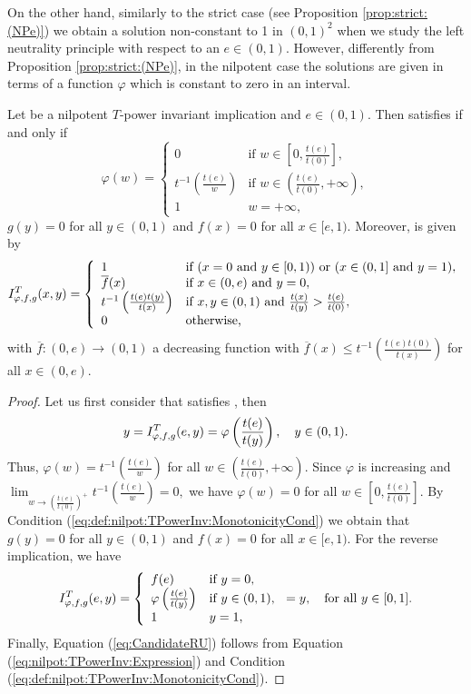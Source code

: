 On the other hand, similarly to the strict case (see Proposition \ref{prop:strict:(NPe)}) we obtain a solution non-constant to 1 in $(0,1)^2$ when we study the left neutrality principle with respect to an $e \in (0,1)$. However, differently from Proposition \ref{prop:strict:(NPe)}, in the nilpotent case the solutions are given in terms of a function $\varphi$ which is constant to zero in an interval.
\begin{proposition}\label{prop:nilpotent:(NPe)}
	Let \IT be a nilpotent $T$-power invariant implication and $e \in (0,1)$. Then \IT satisfies \NPe if and only if 
	$$\varphi(w)
	=
	\left\{ \begin{array}{ll}
		0 &   \text{if }   w \in \left[0,\frac{t(e)}{t(0)}\right], \\
		t^{-1} \left(\frac{t(e)}{w}\right) &  \text{if }  w \in \left(\frac{t(e)}{t(0)},+\infty\right), \\
		1 & w=+ \infty,
	\end{array}
	\right.
	$$
	$g(y)=0$ for all $y \in (0,1)$ and $f(x)=0$ for all $x \in [e,1)$. Moreover, \IT is given by
	\begin{equation}\label{eq:CandidateRU}
		I^T_{\varphi,f,g}(x,y)
		=
		\left\{ \begin{array}{ll}
			1 & \text{if } (x=0 \text{ and } y \in [0,1)) \text{ or } (x \in (0,1] \text{ and } y=1),\\
			\overline{f}(x) & \text{if }   x \in (0,e) \text{ and } y=0, \\
			t^{-1} \left(\frac{t(e)t(y)}{t(x)}\right) &  \text{if } x,y \in (0,1) \text{ and } \frac{t(x)}{t(y)} > \frac{t(e)}{t(0)}, \\
			0 & \text{otherwise,}				
		\end{array}
		\right.
	\end{equation}
	with $\overline{f}:(0,e) \to (0,1)$ a decreasing function with $\overline{f}(x) \leq t^{-1} \left(\frac{t(e)t(0)}{t(x)}\right)$ for all $x \in (0,e)$.
\end{proposition}
\begin{proof}
	Let us first consider that \IT satisfies \NPe, then
	$$y = I^T_{\varphi,f,g}(e,y)=\varphi \left(\frac{t(e)}{t(y)}\right), \quad y \in (0,1).$$
	Thus, $\varphi(w)=t^{-1}\left(\frac{t(e)}{w}\right)$ for all $w \in \left(\frac{t(e)}{t(0)},+\infty\right)$. Since $\varphi$ is increasing and $\displaystyle \lim_{w \to \left(\frac{t(e)}{t(0)}\right)^+} t^{-1} \left( \frac{t(e)}{w}\right)=0,$
	we have $\varphi(w)=0$ for all $w \in \left[0,\frac{t(e)}{t(0)}\right]$. By Condition (\ref{eq:def:nilpot:TPowerInv:MonotonicityCond}) we obtain that $g(y)=0$ for all $y \in (0,1)$ and $f(x)=0$ for all $x \in [e,1)$. For the reverse implication, we have
	$$I^T_{\varphi,f,g}(e,y)
	=
	\left\{ \begin{array}{ll}
		f(e) &   \text{if }   y=0, \\
		\varphi \left(\frac{t(e)}{t(y)}\right) &  \text{if }  y \in (0,1), \\
		1 & y=1,
	\end{array}
	\right.
	=y, \quad \text{for all } y \in [0,1].
	$$
	Finally, Equation (\ref{eq:CandidateRU}) follows from Equation (\ref{eq:nilpot:TPowerInv:Expression}) and Condition (\ref{eq:def:nilpot:TPowerInv:MonotonicityCond}).
\end{proof}

